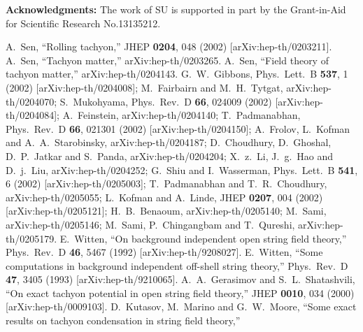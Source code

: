 \documentclass[12pt,a4paper]{article}
\begin{document}
\vspace{5mm}
{\bf Acknowledgments:}
The work of SU is supported in part by the Grant-in-Aid for Scientific
Research No.13135212.

\begin{thebibliography}{99}
A.~Sen,
``Rolling tachyon,''
JHEP {\bf 0204}, 048 (2002)
[arXiv:hep-th/0203211].
A.~Sen,
``Tachyon matter,''
arXiv:hep-th/0203265.
A.~Sen,
``Field theory of tachyon matter,''
arXiv:hep-th/0204143.
G.~W.~Gibbons,
Phys.\ Lett.\ B {\bf 537}, 1 (2002)
[arXiv:hep-th/0204008];
M.~Fairbairn and M.~H.~Tytgat,
arXiv:hep-th/0204070;
S.~Mukohyama,
Phys.\ Rev.\ D {\bf 66}, 024009 (2002)
[arXiv:hep-th/0204084];
A.~Feinstein,
arXiv:hep-th/0204140;
T.~Padmanabhan,
Phys.\ Rev.\ D {\bf 66}, 021301 (2002)
[arXiv:hep-th/0204150];
A.~Frolov, L.~Kofman and A.~A.~Starobinsky,
arXiv:hep-th/0204187;
D.~Choudhury, D.~Ghoshal, D.~P.~Jatkar and S.~Panda,
arXiv:hep-th/0204204;
X.~z.~Li, J.~g.~Hao and D.~j.~Liu,
arXiv:hep-th/0204252;
G.~Shiu and I.~Wasserman,
Phys.\ Lett.\ B {\bf 541}, 6 (2002)
[arXiv:hep-th/0205003];
T.~Padmanabhan and T.~R.~Choudhury,
arXiv:hep-th/0205055;
L.~Kofman and A.~Linde,
JHEP {\bf 0207}, 004 (2002)
[arXiv:hep-th/0205121];
H.~B.~Benaoum,
arXiv:hep-th/0205140;
M.~Sami,
arXiv:hep-th/0205146;
M.~Sami, P.~Chingangbam and T.~Qureshi,
arXiv:hep-th/0205179.
E.~Witten,
``On background independent open string field theory,''
Phys.\ Rev.\ D {\bf 46}, 5467 (1992)
[arXiv:hep-th/9208027].
E.~Witten,
``Some computations in background independent off-shell string theory,''
Phys.\ Rev.\ D {\bf 47}, 3405 (1993)
[arXiv:hep-th/9210065].
A.~A.~Gerasimov and S.~L.~Shatashvili,
``On exact tachyon potential in open string field theory,''
JHEP {\bf 0010}, 034 (2000)
[arXiv:hep-th/0009103].
D.~Kutasov, M.~Marino and G.~W.~Moore,
``Some exact results on tachyon condensation in string field theory,''

\end{thebibliography}
\end{document}

